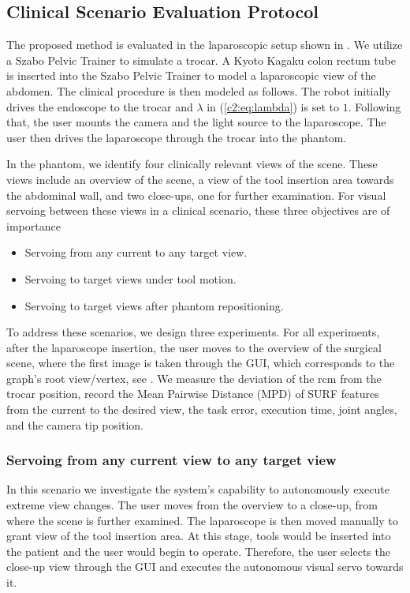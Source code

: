
\subsection{Clinical Scenario Evaluation Protocol}
\label{c2:sec:clin_protocol}

The proposed method is evaluated in the laparoscopic setup shown in . We utilize a Szabo Pelvic Trainer to simulate a trocar. A Kyoto Kagaku colon rectum tube is inserted into the Szabo Pelvic Trainer to model a laparoscopic view of the abdomen. The clinical procedure is then modeled as follows. The robot initially drives the endoscope to the trocar and $\lambda$ in (\eqref{c2:eq:lambda}) is set to $1$. Following that, the user mounts the camera and the light source to the laparoscope. The user then drives the laparoscope through the trocar into the phantom.

In the phantom, we identify four clinically relevant views of the scene. These views include an overview of the scene, a view of the tool insertion area towards the abdominal wall, and two close-ups, one for further examination. For visual servoing between these views in a clinical scenario, these three objectives are of importance

\begin{itemize}
    \item Servoing from any current to any target view.
    \item Servoing to target views under tool motion.
    \item Servoing to target views after phantom repositioning.
\end{itemize}

To address these scenarios, we design three experiments. For all experiments, after the laparoscope insertion, the user moves to the overview of the surgical scene, where the first image is taken through the GUI, which corresponds to the graph's root view/vertex, see . We measure the deviation of the \acrshort{rcm} from the trocar position, record the Mean Pairwise Distance (MPD) of SURF features from the current to the desired view, the task error, execution time, joint angles, and the camera tip position.

\subsubsection{Servoing from any current view to any target view}
\label{c2:sec:clin_protocol_any}
In this scenario we investigate the system's capability to autonomously execute extreme view changes. The user moves from the overview to a close-up, from where the scene is further examined. The laparoscope is then moved manually to grant view of the tool insertion area. At this stage, tools would be inserted into the patient and the user would begin to operate. Therefore, the user selects the close-up view through the GUI and executes the autonomous visual servo towards it.

